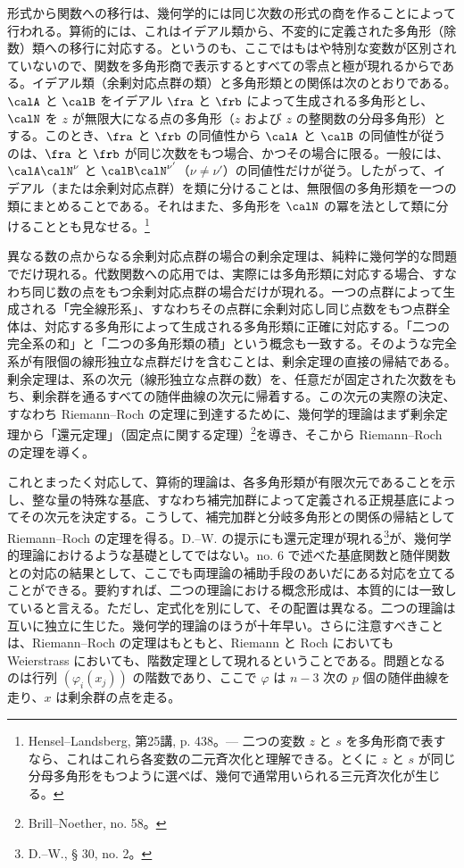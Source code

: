\documentclass[11pt]{article}
\begin{document}
形式から関数への移行は、幾何学的には同じ次数の形式の商を作ることによって行われる。算術的には、これはイデアル類から、不変的に定義された多角形（除数）類への移行に対応する。というのも、ここではもはや特別な変数が区別されていないので、関数を多角形商で表示するとすべての零点と極が現れるからである。イデアル類（余剰対応点群の類）と多角形類との関係は次のとおりである。\(\calA\) と \(\calB\) をイデアル \(\fra\) と \(\frb\) によって生成される多角形とし、\(\calN\) を \(z\) が無限大になる点の多角形（\(z\) および \(z\) の整関数の分母多角形）とする。このとき、\(\fra\) と \(\frb\) の同値性から \(\calA\) と \(\calB\) の同値性が従うのは、\(\fra\) と \(\frb\) が同じ次数をもつ場合、かつその場合に限る。一般には、\(\calA\calN^\nu\) と \(\calB\calN^{\nu'}\)（\(\nu\ne\nu'\)）の同値性だけが従う。したがって、イデアル（または余剰対応点群）を類に分けることは、無限個の多角形類を一つの類にまとめることである。それはまた、多角形を \(\calN\) の冪を法として類に分けることとも見なせる。\footnote{Hensel--Landsberg, 第25講, p. 438。--- 二つの変数 \(z\) と \(s\) を多角形商で表すなら、これはこれら各変数の二元斉次化と理解できる。とくに \(z\) と \(s\) が同じ分母多角形をもつように選べば、幾何で通常用いられる三元斉次化が生じる。}

異なる数の点からなる余剰対応点群の場合の剰余定理は、純粋に幾何学的な問題でだけ現れる。代数関数への応用では、実際には多角形類に対応する場合、すなわち同じ数の点をもつ余剰対応点群の場合だけが現れる。一つの点群によって生成される「完全線形系」、すなわちその点群に余剰対応し同じ点数をもつ点群全体は、対応する多角形によって生成される多角形類に正確に対応する。「二つの完全系の和」と「二つの多角形類の積」という概念も一致する。そのような完全系が有限個の線形独立な点群だけを含むことは、剰余定理の直接の帰結である。剰余定理は、系の次元（線形独立な点群の数）を、任意だが固定された次数をもち、剰余群を通るすべての随伴曲線の次元に帰着する。この次元の実際の決定、すなわち Riemann--Roch の定理に到達するために、幾何学的理論はまず剰余定理から「還元定理」（固定点に関する定理）\footnote{Brill--Noether, no. 58。}を導き、そこから Riemann--Roch の定理を導く。

これとまったく対応して、算術的理論は、各多角形類が有限次元であることを示し、整な量の特殊な基底、すなわち補完加群によって定義される正規基底によってその次元を決定する。こうして、補完加群と分岐多角形との関係の帰結として Riemann--Roch の定理を得る。D.--W. の提示にも還元定理が現れる\footnote{D.--W., § 30, no. 2。}が、幾何学的理論におけるような基礎としてではない。no. 6 で述べた基底関数と随伴関数との対応の結果として、ここでも両理論の補助手段のあいだにある対応を立てることができる。要約すれば、二つの理論における概念形成は、本質的には一致していると言える。ただし、定式化を別にして、その配置は異なる。二つの理論は互いに独立に生じた。幾何学的理論のほうが十年早い。さらに注意すべきことは、Riemann--Roch の定理はもともと、Riemann と Roch においても Weierstrass においても、階数定理として現れるということである。問題となるのは行列 \((\varphi_i(x_j))\) の階数であり、ここで \(\varphi\) は \(n-3\) 次の \(p\) 個の随伴曲線を走り、\(x\) は剰余群の点を走る。
\end{document}
